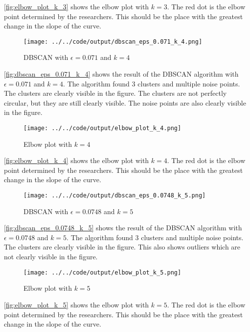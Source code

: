 \documentclass[twoside, a4paper, fleqn, reqno]{article}
\begin{document}
\autoref{fig:elbow_plot_k_3} shows the elbow plot with $k=3$.
The red dot is the elbow point determined by the researchers.
This should be the place with the greatest change in the slope of the curve.

\begin {figure}[H]
	\centering
	\texttt{[image: ../../code/output/dbscan\_eps\_0.071\_k\_4.png]}
	\caption{DBSCAN with $\epsilon=0.071$ and $k=4$}
	\label{fig:dbscan_eps_0.071_k_4}
\end {figure}

\autoref{fig:dbscan_eps_0.071_k_4} shows the result of the DBSCAN algorithm with $\epsilon=0.071$ and $k=4$.
The algorithm found 3 clusters and multiple noise points.
The clusters are clearly visible in the figure.
The clusters are not perfectly circular, but they are still clearly visible.
The noise points are also clearly visible in the figure.

\begin {figure}[H]
	\centering
	\texttt{[image: ../../code/output/elbow\_plot\_k\_4.png]}
	\caption{Elbow plot with $k=4$}
	\label{fig:elbow_plot_k_4}
\end {figure}

\autoref{fig:elbow_plot_k_4} shows the elbow plot with $k=4$.
The red dot is the elbow point determined by the researchers.
This should be the place with the greatest change in the slope of the curve.

\begin {figure}[H]
	\centering
	\texttt{[image: ../../code/output/dbscan\_eps\_0.0748\_k\_5.png]}
	\caption{DBSCAN with $\epsilon=0.0748$ and $k=5$}
	\label{fig:dbscan_eps_0.0748_k_5}
\end {figure}

\autoref{fig:dbscan_eps_0.0748_k_5} shows the result of the DBSCAN algorithm with $\epsilon=0.0748$ and $k=5$.
The algorithm found 3 clusters and multiple noise points.
The clusters are clearly visible in the figure.
This also shows outliers which are not clearly visible in the figure.

\begin {figure}[H]
	\centering
	\texttt{[image: ../../code/output/elbow\_plot\_k\_5.png]}
	\caption{Elbow plot with $k=5$}
	\label{fig:elbow_plot_k_5}
\end {figure}

\autoref{fig:elbow_plot_k_5} shows the elbow plot with $k=5$.
The red dot is the elbow point determined by the researchers.
This should be the place with the greatest change in the slope of the curve.
\end{document}
